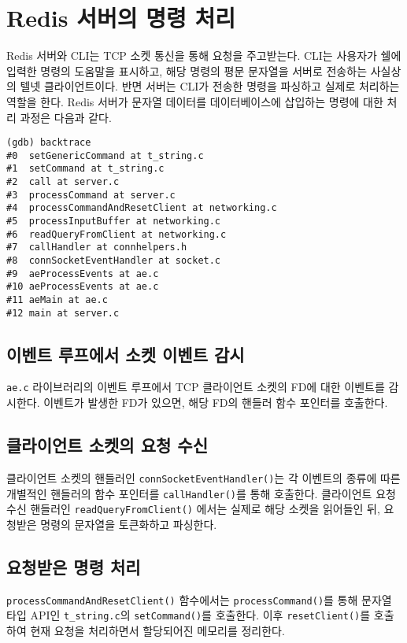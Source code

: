 \documentclass[11pt]{article}
\begin{document}
\section{Redis 서버의 명령 처리}
Redis 서버와 CLI는 TCP 소켓 통신을 통해 요청을 주고받는다. CLI는 사용자가 쉘에
입력한 명령의 도움말을 표시하고, 해당 명령의 평문 문자열을 서버로 전송하는 사실상의
텔넷 클라이언트이다. 반면 서버는 CLI가 전송한 명령을 파싱하고 실제로 처리하는 역할을
한다. Redis 서버가 문자열 데이터를 데이터베이스에 삽입하는 명령에 대한 처리 과정은
다음과 같다.

\begin{lstlisting}[style=gdb]
(gdb) backtrace
#0  setGenericCommand at t_string.c
#1  setCommand at t_string.c
#2  call at server.c
#3  processCommand at server.c
#4  processCommandAndResetClient at networking.c
#5  processInputBuffer at networking.c
#6  readQueryFromClient at networking.c
#7  callHandler at connhelpers.h
#8  connSocketEventHandler at socket.c
#9  aeProcessEvents at ae.c
#10 aeProcessEvents at ae.c
#11 aeMain at ae.c
#12 main at server.c
\end{lstlisting}

\subsection{이벤트 루프에서 소켓 이벤트 감시}
\texttt{ae.c} 라이브러리의 이벤트 루프에서 TCP 클라이언트 소켓의 FD에 대한 이벤트를
감시한다. 이벤트가 발생한 FD가 있으면, 해당 FD의 핸들러 함수 포인터를 호출한다.

\subsection{클라이언트 소켓의 요청 수신}
클라이언트 소켓의 핸들러인 \texttt{connSocketEventHandler()}는 각 이벤트의 종류에
따른 개별적인 핸들러의 함수 포인터를 \texttt{callHandler()}를 통해 호출한다.
클라이언트 요청 수신 핸들러인 \texttt{readQueryFromClient()} 에서는 실제로 해당
소켓을 읽어들인 뒤, 요청받은 명령의 문자열을 토큰화하고 파싱한다.

\subsection{요청받은 명령 처리}
\texttt{processCommandAndResetClient()} 함수에서는
\texttt{processCommand()}를 통해 문자열 타입 API인 \texttt{t\_string.c}의
\texttt{setCommand()}를 호출한다. 이후 \texttt{resetClient()}를 호출하여 현재
요청을 처리하면서 할당되어진 메모리를 정리한다.
\end{document}
